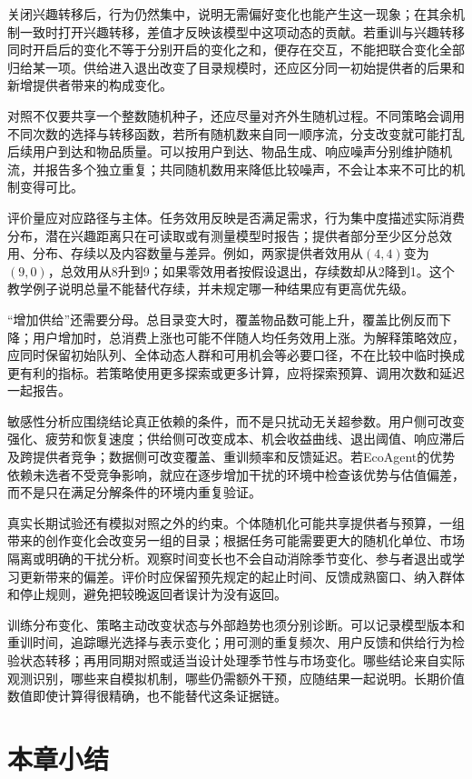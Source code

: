 关闭兴趣转移后，行为仍然集中，说明无需偏好变化也能产生这一现象；在其余机制一致时打开兴趣转移，差值才反映该模型中这项动态的贡献。若重训与兴趣转移同时开启后的变化不等于分别开启的变化之和，便存在交互，不能把联合变化全部归给某一项。供给进入退出改变了目录规模时，还应区分同一初始提供者的后果和新增提供者带来的构成变化。

对照不仅要共享一个整数随机种子，还应尽量对齐外生随机过程。不同策略会调用不同次数的选择与转移函数，若所有随机数来自同一顺序流，分支改变就可能打乱后续用户到达和物品质量。可以按用户到达、物品生成、响应噪声分别维护随机流，并报告多个独立重复；共同随机数用来降低比较噪声，不会让本来不可比的机制变得可比。

评价量应对应路径与主体。任务效用反映是否满足需求，行为集中度描述实际消费分布，潜在兴趣距离只在可读取或有测量模型时报告；提供者部分至少区分总效用、分布、存续以及内容数量与差异。例如，两家提供者效用从$(4,4)$变为$(9,0)$，总效用从8升到9；如果零效用者按假设退出，存续数却从2降到1。这个教学例子说明总量不能替代存续，并未规定哪一种结果应有更高优先级。

“增加供给”还需要分母。总目录变大时，覆盖物品数可能上升，覆盖比例反而下降；用户增加时，总消费上涨也可能不伴随人均任务效用上涨。为解释策略效应，应同时保留初始队列、全体动态人群和可用机会等必要口径，不在比较中临时换成更有利的指标。若策略使用更多探索或更多计算，应将探索预算、调用次数和延迟一起报告。

敏感性分析应围绕结论真正依赖的条件，而不是只扰动无关超参数。用户侧可改变强化、疲劳和恢复速度；供给侧可改变成本、机会收益曲线、退出阈值、响应滞后及跨提供者竞争；数据侧可改变覆盖、重训频率和反馈延迟。若EcoAgent的优势依赖未选者不受竞争影响，就应在逐步增加干扰的环境中检查该优势与估值偏差，而不是只在满足分解条件的环境内重复验证。

真实长期试验还有模拟对照之外的约束。个体随机化可能共享提供者与预算，一组带来的创作变化会改变另一组的目录；根据任务可能需要更大的随机化单位、市场隔离或明确的干扰分析。观察时间变长也不会自动消除季节变化、参与者退出或学习更新带来的偏差。评价时应保留预先规定的起止时间、反馈成熟窗口、纳入群体和停止规则，避免把较晚返回者误计为没有返回。

训练分布变化、策略主动改变状态与外部趋势也须分别诊断。可以记录模型版本和重训时间，追踪曝光选择与表示变化；用可测的重复频次、用户反馈和供给行为检验状态转移；再用同期对照或适当设计处理季节性与市场变化。哪些结论来自实际观测识别，哪些来自模拟机制，哪些仍需额外干预，应随结果一起说明。长期价值数值即使计算得很精确，也不能替代这条证据链。

\section{本章小结}
\label{sec:rs-long-term-summary}


